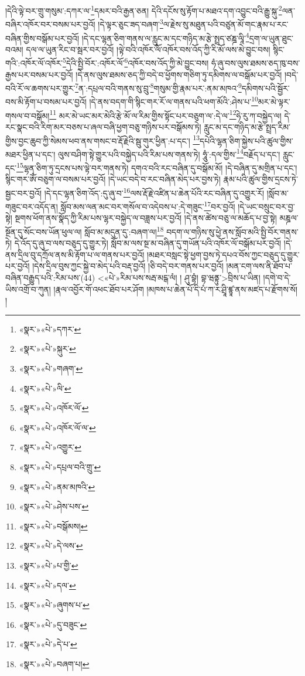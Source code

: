 །དེའི་ལྟེ་བར་གྲུ་གསུམ་:དཀར་ལ་\footnote{«སྣར་»«པེ་»དཀར་}དམར་བའི་རྒྱན་ཅན། དེའི་དངོས་སུ་རྟོག་པ་མཐའ་དག་འབྱུང་བའི་རྒྱུ་སྐུ་\footnote{«སྣར་»«པེ་»སྐུར་}ལན་བཞིར་འཁོར་བར་བསམ་པར་བྱའོ། །དེ་ལྟར་ཅུང་ཟད་བཞག་\footnote{«སྣར་»«པེ་»གཞག་}ལ་རྗེས་སུ་མཐུན་པའི་བཙུན་མོ་གང་རྣམ་པ་རང་བཞིན་གྱིས་བསྒོམ་པར་བྱའོ། །དེ་དང་ལྷན་ཅིག་གནས་ལ་རླུང་མ་དང་གཉིད་མ་རྩེ་སྤྲད་ཙཎྜ་ལཱི་\footnote{«སྣར་»«པེ་»ལི་}དྲག་ལ་ཡུན་ཐུང་བའམ། དལ་ལ་ཡུན་རིང་བ་སྦར་བར་བྱའོ། །ལྟེ་བའི་འཁོར་ལོ་འཁོར་བས་འོད་ཀྱི་རི་མོ་ལས་མེ་བྱུང་བས། སྙིང་གའི་:འཁོར་ལོ་འཁོར་\footnote{«སྣར་»«པེ་»འཁོར་ལོ་}དེའི་སྤྱི་བོར་:འཁོར་ལོ་\footnote{«སྣར་»«པེ་»འཁོར་ལོ་ལ་}འཁོར་བས་འོད་ཀྱི་མེ་བྱུང་བས། ཧཾ་ཞུ་བས་ལུས་ཐམས་ཅད་ཁུ་བས་རྒྱས་པར་བསམ་པར་བྱའོ། །དེ་ནས་ལུས་ཐམས་ཅད་ཀྱི་བདེ་བ་ཕྱོགས་གཅིག་ཏུ་དམིགས་ལ་བསྒོམ་པར་བྱའོ། །བདེ་བའི་རོ་ལ་ཆགས་པར་གྱུར་\footnote{«སྣར་»«པེ་»འགྱུར་}ན་:དཔྲལ་བའི་གནས་སུ་བྲུ་\footnote{«སྣར་»«པེ་»དཔྲལ་བའི་གྲུ་}གསུམ་གྱི་རྣམ་པར་:ནམ་མཁའ་\footnote{«སྣར་»«པེ་»ནམ་མཁའི་}དམིགས་པའི་སྦྱོར་བས་མི་རྟོག་པ་བསམ་པར་བྱའོ། །དེ་ནས་བདག་གི་སྙིང་གར་རོ་ལ་གནས་པའི་ཕག་མོའི་:ཤེས་པ་\footnote{«སྣར་»«པེ་»ཤེས་པས་}མར་མེ་ལྟར་གསལ་བ་བསྒོམ།\footnote{«སྣར་»«པེ་»བསྒོམས།} མར་མེ་ཡང་མར་མེའི་རྩེ་མོ་ལ་རིམ་གྱིས་སྟོང་པར་བཅུག་ལ་:དེ་ལ་\footnote{«སྣར་»«པེ་»དེ་ལས་}ཧེ་རུ་ཀ་བསྐྱེད་ལ། དེ་རང་སྣང་བའི་རིག་མར་བཅས་པ་ཞལ་བཞི་ཕྱག་བཅུ་གཉིས་པར་བསྒོམས་ཏེ། རླུང་མ་དང་གཉིད་མ་རྩེ་སྤྲད་རིམ་གྱིས་བྱང་ཆུབ་ཀྱི་སེམས་ཕབ་ནས་གསང་བ་རྡོ་རྗེའི་སྦུ་གུར་ཕྱིན་:པ་དང་། \footnote{«སྣར་»«པེ་»པ་གྱི་}དཔེའི་ལྷན་ཅིག་སྐྱེས་པའི་ཚུལ་གྱིས་མཐར་ཕྱིན་པ་དང་། ལུས་བཤིག་སྟེ་གྱུར་པའི་བསྐྱེད་པའི་རིམ་པས་གནས་ཏེ། ཧཱུཾ་:དལ་གྱིས་\footnote{«སྣར་»«པེ་»དལ་}བརྗོད་པ་དང་། རླུང་དང་\footnote{«སྣར་»«པེ་»ཞུགས་པ་}ལྷན་ཅིག་ཏུ་དྲངས་པས་ལྟེ་བར་གནས་ཏེ། དགའ་བའི་རང་བཞིན་དུ་བསྒོམ་མོ། །དེ་བཞིན་དུ་མགྲིན་པ་དང་། སྙིང་གར་ཨོཾ་བཅུག་ལ་བསམ་པར་བྱའོ། །དེ་ཡང་བདེ་བ་རང་བཞིན་མེད་པར་བྱས་ཏེ། རྣམ་པའི་ཚུལ་གྱིས་དྲངས་ཏེ་སྦྱང་བར་བྱའོ། །དེ་དང་ལྷན་ཅིག་འོད་:དུ་ཞུ་བ་\footnote{«སྣར་»«པེ་»དུ་བཟུང་}ལས་རྡོ་རྗེ་འཛིན་པ་ཆེན་པོའི་རང་བཞིན་དུ་འགྱུར་རོ། །སློབ་མ་གཟུང་བར་འདོད་ན། སློབ་མས་ལན་མང་བར་གསོལ་བ་འདེབས་པ་:དེ་གཟུང་\footnote{«སྣར་»«པེ་»དེ་པ་}བར་བྱའོ། །དེ་ཡང་བསྲུང་བར་བྱ་སྟེ། སྔགས་ཕོག་ནས་སྣོད་ཀྱི་རིམ་པས་ལྷར་བསྐྱེད་ལ་བཟླས་པར་བྱའོ། །དེ་ནས་ཚེས་བཅུ་ལ་མཆོད་པ་བྱ་སྟེ། མཎྜལ་སྔོན་དུ་སོང་བས་ཡོན་ཕུལ་ལ། སློབ་མ་མདུན་དུ་:བཞག་ལ།\footnote{«སྣར་»«པེ་»བཞག་པ།} བདག་ལ་གཉིས་སུ་ཕྱེ་ནས་སློབ་མའི་སྤྱི་བོར་གནས་ཏེ། དེ་འོད་དུ་ཞུ་བ་ལས་བཅུད་དུ་གྱུར་ཏེ། སློབ་མ་ལས་སྔ་མ་བཞིན་དུ་གཡོན་པའི་འཁོར་ལོ་བསྒོམ་པར་བྱའོ། །དེ་ནས་དྲིལ་བུ་དཀྲོལ་ནས་མི་རྟོག་པ་ལ་གནས་པར་བྱའོ། །མཐར་བསླང་སྟེ་ཕྱག་བྱས་ཏེ་དཔའ་བོས་ཀྱང་བཅུད་དུ་གྱུར་པར་བྱའོ། །དེས་དྲིལ་བུས་ཀྱང་སྐྱེ་བ་མེད་པའི་བརྡ་བྱའོ། །ཅི་བདེ་བར་གནས་པར་བྱའོ། །མན་ངག་ལས་ནི་ཐོབ་པ་བཞིན་བརྒྱུད་པའི་:རིམ་པས་(44) <«པེ་»རིམ་པས་སརྦ་མངྒ་ལཾ། །
ཤུ་བྷཾ། བྷ་ཝནྟུ་>བྲིས་པ་ཡིན། །དགེ་བ་དེ་ཡིས་འགྲོ་བ་ཀུན། །རྣལ་འབྱོར་གོ་འཕང་ཐོབ་པར་ཤོག །མཁས་པ་ཆེན་པོ་དི་པཾ་ཀ་ར་ཤྲཱི་ཛྙཱ་ནས་མཛད་པ་རྫོགས་སོ། །